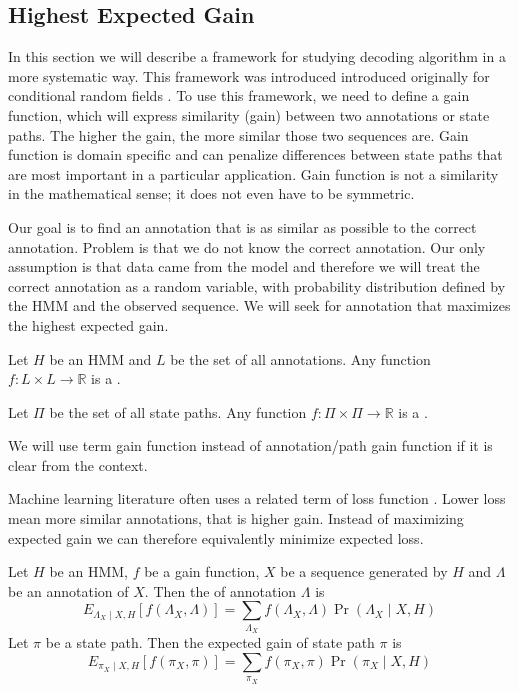 \subsection{Highest Expected Gain}

In this section we will describe a framework for studying decoding algorithm in
a more systematic way. This framework was introduced introduced originally for
conditional random fields \cite{Gross2007}.  To use this framework, we need to
define a gain function, which will express similarity (gain) between two
annotations or state paths. The higher the gain, the more similar those two
sequences are. Gain function is domain specific and can penalize differences
between state paths that are most important in a particular application.  Gain
function is not a similarity in the mathematical sense; it does not even have to
be symmetric.

Our goal is to find an annotation that is as similar as possible to the correct
annotation. Problem is that we do not know the correct annotation. Our only
assumption is that data came from the model and therefore we will treat the
correct annotation as a random variable, with probability distribution defined
by the HMM and the observed sequence. We will seek for annotation that maximizes
the highest expected gain.

\begin{definition}
Let $H$ be an HMM and $L$ be the set of all annotations. Any function
$f:L\times L\to \mathbb{R}$ is a .

Let $\Pi$ be the set of all state paths. Any function $f:\Pi\times
\Pi\to\mathbb{R}$ is a .

\end{definition}

\begin{note}
We will use term gain function instead of annotation/path gain function if it is
clear from the context.

Machine learning literature often uses a related term of loss function
\cite{}. Lower loss mean more similar annotations, that is higher gain. Instead
of maximizing expected gain we can therefore equivalently minimize expected
loss.
\end{note}

\begin{definition}
Let $H$ be an HMM, $f$ be a gain function, $X$ be a sequence generated by $H$ and
$\Lambda$ be an annotation of $X$. Then the  of annotation
$\Lambda$ is 
\begin{equation}
E_{\Lambda_X\mid X,H}[f(\Lambda_X,\Lambda)] =
\sum_{\Lambda_X}f(\Lambda_X,\Lambda)\Pr\left(\Lambda_X\mid X,H\right)
\end{equation}
Let $\pi$ be a state path. Then the expected gain of state path $\pi$ is 
\begin{equation}
E_{\pi_X\mid X,H}[f(\pi_X,\pi)] =
\sum_{\pi_X}f(\pi_X,\pi)\Pr\left(\pi_X\mid X,H\right)
\end{equation}

\end{definition}



